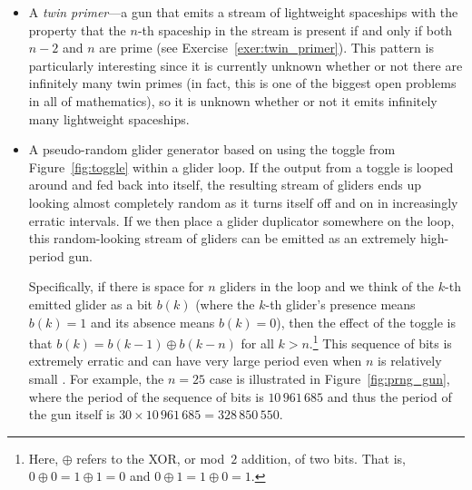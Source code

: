 \begin{itemize}
	\item A \emph{twin primer}---a gun that emits a stream of lightweight spaceships with the property that the $n$-th spaceship in the stream is present if and only if both $n-2$ and $n$ are prime (see Exercise~\ref{exer:twin_primer}). This pattern is particularly interesting since it is currently unknown whether or not there are infinitely many twin primes (in fact, this is one of the biggest open problems in all of mathematics), so it is unknown whether or not it emits infinitely many lightweight spaceships.\smallskip
	
	\item A pseudo-random glider generator based on using the toggle from Figure~\ref{fig:toggle} within a glider loop. If the output from a toggle is looped around and fed back into itself, the resulting stream of gliders ends up looking almost completely random as it turns itself off and on in increasingly erratic intervals. If we then place a glider duplicator somewhere on the loop, this random-looking stream of gliders can be emitted as an extremely high-period gun.
	
	Specifically, if there is space for $n$ gliders in the loop and we think of the $k$-th emitted glider as a bit $b(k)$ (where the $k$-th glider's presence means $b(k) = 1$ and its absence means $b(k) = 0$), then the effect of the toggle is that $b(k) = b(k-1) \oplus b(k-n)$ for all $k > n$.\footnote{Here, $\oplus$ refers to the XOR, or mod~$2$ addition, of two bits. That is, $0 \oplus 0 = 1 \oplus 1 = 0$ and $0 \oplus 1 = 1 \oplus 0 = 1$.} This sequence of bits is extremely erratic and can have very large period even when $n$ is relatively small \cite{A046932}. For example, the $n = 25$ case is illustrated in Figure~\ref{fig:prng_gun}, where the period of the sequence of bits is $10\,961\,685$ and thus the period of the gun itself is $30 \times 10\,961\,685 = 328\,850\,550$.\smallskip
%
	

\end{itemize}
